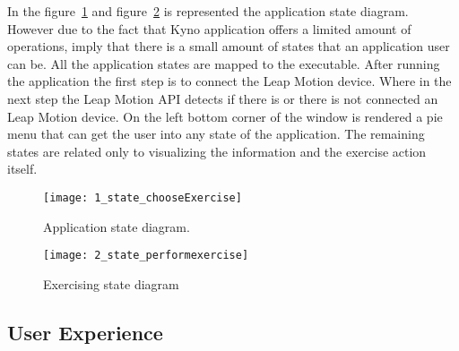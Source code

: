 \vspace{0.2cm}

In the  \mbox{figure \ref{state_choose}} and  \mbox{figure \ref{state_perform}} is represented the application state diagram.
 However due to the fact that Kyno application offers a limited amount of operations, imply that there is a small amount of states that an application user can be. All the application states are mapped to the executable. After running the application the first step is to connect the Leap Motion device. Where in the next step the Leap Motion API detects if there is or there is not connected an Leap Motion device. On the left bottom corner of the window is rendered a pie menu that can get the user into any state of the application. The remaining states are related only to visualizing the information and the exercise action itself.


\begin{figure}[!h]
\centering
\texttt{[image: 1\_state\_chooseExercise]}
\caption{Application state diagram.}\label{state_choose}
\end{figure}
\newpage

\begin{figure}[!h]
\centering
\texttt{[image: 2\_state\_performexercise]}
\caption{Exercising state diagram}\label{state_perform}
\end{figure}



\subsection{User Experience}


\clearpage